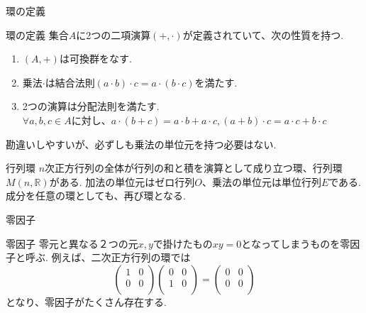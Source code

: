 \documentclass[dvipdfmx,11pt,notheorems]{beamer}
\begin{document}
\begin{frame}{環の定義}
  \begin{block}{環の定義}
    集合$A$に2つの二項演算$(+,\cdot)$が定義されていて、次の性質を持つ.
    \begin{enumerate}
      \item $(A,+)$は可換群をなす.
      \item 乗法$\cdot$は結合法則$(a\cdot b)\cdot c=a\cdot(b\cdot c)$を満たす.
      \item 2つの演算は\alert{分配法則}を満たす.\\
      $\forall a,b,c \in A$に対し、$a\cdot(b+c)=a\cdot b + a\cdot c,    (a+b)\cdot c=a\cdot c+b\cdot c$
    \end{enumerate}
    勘違いしやすいが、必ずしも乗法の単位元を持つ必要はない. \\

  \end{block}
  \begin{exampleblock}{行列環}
    $n$次正方行列の全体が行列の和と積を演算として成り立つ環、行列環$M(n,\mathbb{R})$がある. 加法の単位元はゼロ行列$O$、乗法の単位元は単位行列$E$である.\\
    成分を任意の環としても、再び環となる.
  \end{exampleblock}
\end{frame}

\begin{frame}{零因子}
  \begin{block}{零因子}
    零元と異なる２つの元$x,y$で掛けたもの$xy=0$となってしまうものを\alert{零因子}と呼ぶ. 例えば、二次正方行列の環では
    \begin{equation}
      \begin{pmatrix}
        1 & 0 \\
        0 & 0 \\
      \end{pmatrix}
      \begin{pmatrix}
        0 & 0 \\
        1 & 0 \\
      \end{pmatrix}
      =
      \begin{pmatrix}
        0 & 0 \\
        0 & 0 \\
      \end{pmatrix}
    \end{equation}
    となり、零因子がたくさん存在する.
  \end{block}
\end{frame}
\end{document}
